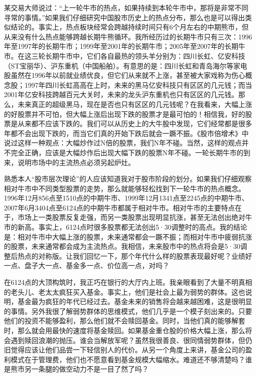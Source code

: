某交易大师说过：“上一轮牛市的热点，如果持续到本轮牛市中，那将是非常不同寻常的事情。”如果我们仔细研究中国股市历史上的热点分布，那么也是可以得出类似结论的。事实上，热点板块经常会跨越持续时间只有6个月左右的中期熊市，但从来没有什么热点能够跨越长期牛熊循环。我所经历过的长期牛市只有三次：1996年至1997年的长期牛市；1999年至2001年的长期牛市；2005年至2007年的长期牛市。在这三轮长期牛市中，它们各自最热的领头羊分别为：四川长虹、亿安科技（ST宝丽华）、沪东重机（中国船舶）。有意思的是：四川长虹和青岛海尔等家电股虽然在1996年以前就业绩优良，但它们从来就不上涨，甚至被大家戏称为伤心概念股；1997年四川长虹高高在上时，未来的黑马亿安科技只有区区的几元钱；而当2001年亿安科技跨越百元大关时，未来的龙头沪东重机也只有区区的几元钱。那么，未来真正的超级黑马，现在是否也只有区区的几元钱呢？在我看来，大幅上涨的好股票并不可怕，但大幅上涨后出现下跌的股票才是最可怕的！相信我，好的股票是从来都不应该下跌的。我们可以从历史上的大牛股中发现，它们经常都是很多年都不会出现下跌的，而当它们真的开始下跌后就会一蹶不振。《股市倍增术》中说过这样一种观点：大幅炒作过N倍的股票，我们N年不碰。当然，这样的观点并不完全正确，应该是大幅炒作后出现大幅下跌的股票N年不碰。一轮长期牛市的到来，说明市场中的主流热点必须另起炉灶。

熟悉本人“股市层次理论”的人应该知道我对于股市阶段的划分。如果我们仔细观察相对牛市中不同类型股票的走势，那么就能够轻松找到下一轮牛市的热点概念。1996年12月856点至1510点的中期牛市、1999年12月1341点至2245点的中期牛市、2007年6月3404点至6124点的中期牛市都属于相对牛市。相对牛市的主要特点在于，市场上一类股票反复走强，而另一类股票出现明显抗涨，甚至无法创出绝对牛市的新高。事实上，6124点时很多股票都无法创出5·30调整时的高点。我的结论是：相对牛市中大幅上涨的股票，未来通常都会一蹶不振；而相对牛市中疲弱抗涨的股票，未来通常都会成为主流热点。我相信，未来股市中的热点将会是5·30调整后热点的对称版。让我们回忆一下，那个年代什么样的股票表现最好呢？业绩好一点、盘子大一点、基金多一点、价位高一点，对吗？

在6124点的大顶构筑时，我正巧在银行的大厅内上班。我亲眼看到了大量不明真相的老头儿、老太太疯狂买入基金。事实上，他们是社会上最为弱势的群体。这也说明，基金最为疯狂的年代已经过去。基金未来的销售将会越来越困难，这是很明显的事情。另外我很了解弱势群体的思维模式，他们几乎是一个模子刻出来的。只要他们的投资不能够盈利，那么他们就不会赎回基金。同时，当他们真的能够解套时，那么就会用最快的速度将基金赎回。如果基金重仓股的价格大幅上涨，那么将会遇到赎回浪潮的抛压。谁会当解放军呢？虽然我很善良、很同情弱势群体，但仍旧觉得应该让他们品尝一下轻信别人的代价。从另一个角度上来讲，基金公司的盈利模式在于管理费，他们也不愿意看到基金规模大幅缩水。难道还不够清楚吗？谁是熊市另一条腿的做空动力不是一目了然了吗？

